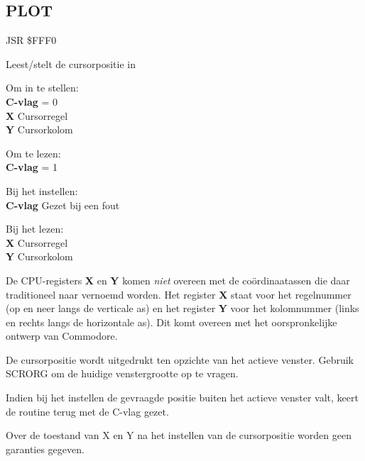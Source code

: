 \subsection{PLOT}
\label{KERNAL Jump Table!PLOT}
\begin{description}[leftmargin=2cm,style=nextline]
    \item [Adres:] JSR \$FFF0    \item [Omschrijving:] Leest/stelt de cursorpositie in    \item [Invoer:]        Om in te stellen: \\        \textbf{C-vlag} = 0 \\        \textbf{X} Cursorregel \\        \textbf{Y} Cursorkolom

        Om te lezen: \\        \textbf{C-vlag} = 1    \item [Uitvoer:]        Bij het instellen: \\        \textbf{C-vlag} Gezet bij een fout

        Bij het lezen: \\        \textbf{X} Cursorregel \\        \textbf{Y} Cursorkolom    \item [Opmerkingen:]        De CPU-registers \textbf{X} en \textbf{Y} komen \textit{niet} overeen met de coördinaatassen die daar traditioneel naar vernoemd worden. Het register \textbf{X} staat voor het regelnummer (op en neer langs de verticale as) en het register \textbf{Y} voor het kolomnummer (links en rechts langs de horizontale as). Dit komt overeen met het oorspronkelijke ontwerp van Commodore.

        De cursorpositie wordt uitgedrukt ten opzichte van het actieve venster. Gebruik SCRORG om de huidige venstergrootte op te vragen.

        Indien bij het instellen de gevraagde positie buiten het actieve venster valt, keert de routine terug met de C-vlag gezet.

        Over de toestand van X en Y na het instellen van de cursorpositie worden geen garanties gegeven.    \item [Voorbeeld:]
\end{description}


